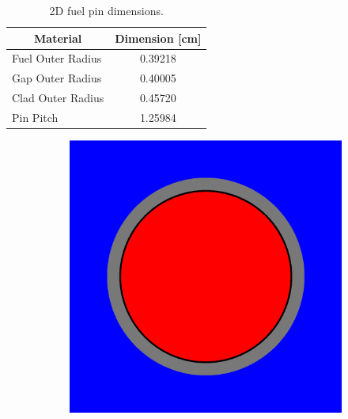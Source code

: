 \begin{table}[h!]
  \centering
  \caption{2D fuel pin dimensions.}
  \label{table:pin-dimensions} 
  \begin{tabular}{l c}
  \toprule
  \multicolumn{1}{c}{\bf Material} &
  {\bf Dimension [cm]} \\
  \midrule
  Fuel Outer Radius & 0.39218 \\
  Gap Outer Radius &  0.40005 \\
  Clad Outer Radius & 0.45720 \\
  Pin Pitch &         1.25984 \\
  \bottomrule
\end{tabular}
\end{table}

\begin{figure}[h!]
\centering
\begin{subfigure}{.25\textwidth}
  \includegraphics[width=0.9\linewidth]{figures/pin-cell-simple}
  \caption{}
  \label{fig:pin-materials}
\end{subfigure}%
\begin{subfigure}{.25\textwidth}
  \centering

\end{subfigure}
\end{figure}
